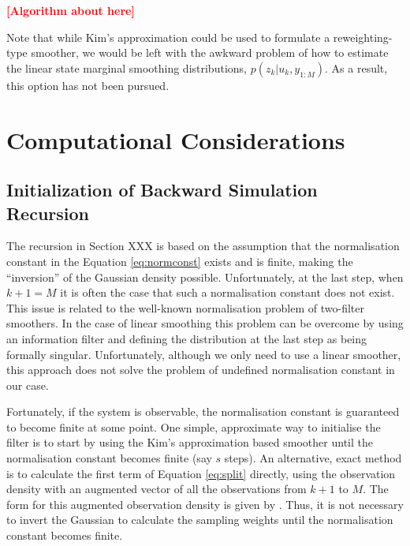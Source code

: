 \documentclass[twocolumn]{autart}    %
\newcommand{\comment}[1]{\textcolor{red}{\textbf{[#1]}}}
\begin{document}
\comment{Algorithm about here}

Note that while Kim's approximation could be used to formulate a reweighting-type smoother, we would be left with the awkward problem of how to estimate the linear state marginal smoothing distributions, $p(z_k | u_k, y_{1:M})$. As a result, this option has not been pursued.

%
%


\section{Computational Considerations}

\subsection{Initialization of Backward Simulation Recursion}
%
The recursion in Section XXX is based on the assumption that the normalisation constant in the Equation \eqref{eq:normconst} exists and is finite, making the ``inversion'' of the Gaussian density possible.  Unfortunately, at the last step, when $k+1 = M$ it is often the case that such a normalisation constant does not exist. This issue is related to the well-known normalisation problem of two-filter smoothers. In the case of linear smoothing this problem can be overcome by using an information filter and defining the distribution at the last step as being formally singular. Unfortunately, although we only need to use a linear smoother, this approach does not solve the problem of undefined normalisation constant in our case.

Fortunately, if the system is observable, the normalisation constant is guaranteed to become finite at some point. One simple, approximate way to initialise the filter is to start by using the Kim's approximation based smoother until the normalisation constant becomes finite (say $s$ steps). An alternative, exact method is to calculate the first term of Equation \eqref{eq:split} directly, using the observation density with an augmented vector of all the observations from $k+1$ to $M$. The form for this augmented observation density is given by \cite{Kitagawa:1994}. Thus, it is not necessary to invert the Gaussian to calculate the sampling weights until the normalisation constant becomes finite.
\end{document}
